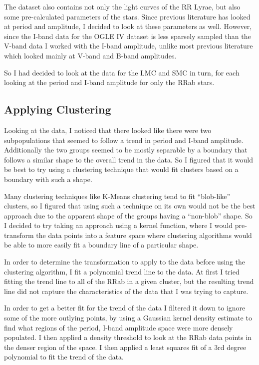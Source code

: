 \documentclass[]{article}
\begin{document}
The dataset also contains not only the light curves of the RR Lyrae, but also some pre-calculated parameters of the stars. Since previous literature has looked at period and amplitude, I decided to look at these parameters as well. However, since the I-band data for the OGLE IV dataset is less sparsely sampled than the V-band data I worked with the I-band amplitude, unlike most previous literature which looked mainly at V-band and B-band amplitudes.

So I had decided to look at the data for the LMC and SMC in turn, for each looking at the period and I-band amplitude for only the RRab stars.

\subsection{Applying Clustering}
Looking at the data, I noticed that there looked like there were two subpopulations that seemed to follow a trend in period and I-band amplitude. Additionally the two groups seemed to be mostly separable by a boundary that follows a similar shape to the overall trend in the data. So I figured that it would be best to try using a clustering technique that would fit clusters based on a boundary with such a shape.

Many clustering techniques like K-Means clustering tend to fit ``blob-like'' clusters, so I figured that using such a technique on its own would not be the best approach due to the apparent shape of the groups having a ``non-blob'' shape. So I decided to try taking an approach using a kernel function, where I would pre-transform the data points into a feature space where clustering algorithms would be able to more easily fit a boundary line of a particular shape.

In order to determine the transformation to apply to the data before using the clustering algorithm, I fit a polynomial trend line to the data. At first I tried fitting the trend line to all of the RRab in a given cluster, but the resulting trend line did not capture the characteristics of the data that I was trying to capture.

In order to get a better fit for the trend of the data I filtered it down to ignore some of the more outlying points, by using a Gaussian kernel density estimate to find what regions of the period, I-band amplitude space were more densely populated. I then applied a density threshold to look at the RRab data points in the denser region of the space. I then applied a least squares fit of a 3rd degree polynomial to fit the trend of the data.
\end{document}

